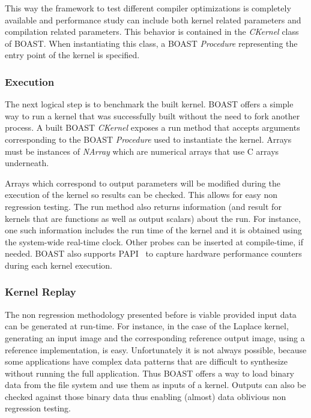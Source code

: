 \documentclass{IEEEtran}
\begin{document}
This way the framework to test different compiler optimizations is completely
available and performance study can include both kernel related parameters and
compilation related parameters. This behavior is contained in the
\emph{CKernel} class of BOAST. When instantiating this class, a BOAST
\emph{Procedure} representing the entry point of the kernel is specified.

\subsubsection{Execution}

The next logical step is to benchmark the built kernel. BOAST offers a simple
way to run a kernel that was successfully built without the need to fork
another process. A built BOAST \emph{CKernel} exposes a run method that
accepts arguments corresponding to the BOAST \emph{Procedure} used to
instantiate the kernel. Arrays must be instances of \emph{NArray} which are
numerical arrays that use C arrays underneath.

Arrays which correspond to output parameters will be modified during the
execution of the kernel so results can be checked. This allows for easy non
regression testing. The run method also returns information (and result for
kernels that are functions as well as output scalars) about the run. For
instance, one such information includes the run time of the kernel and it is
obtained using the system-wide real-time clock. Other probes can be inserted at
compile-time, if needed.  BOAST also supports PAPI~\cite{mucci1999papi} to
capture hardware performance counters during each kernel execution.

\subsubsection{Kernel Replay}

The non regression methodology presented before is viable provided input data
can be generated at run-time. For instance, in the case of the Laplace kernel,
generating an input image and the corresponding reference output image, using a
reference implementation, is easy. Unfortunately it is not always possible,
because some applications have complex data patterns that are difficult to
synthesize without running the full application. Thus BOAST offers a way to load
binary data from the file system and use them as inputs of a kernel. Outputs can
also be checked against those binary data thus enabling (almost) data oblivious
non regression testing.
\end{document}
